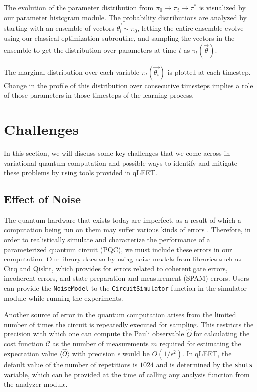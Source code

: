 The evolution of the parameter distribution from $\pi_0 \rightarrow \pi_t \rightarrow \pi^*$ is visualized by our parameter histogram module. The probability distributions are analyzed by starting with an ensemble of vectors $\vec{\theta_l} \sim \pi_0$, letting the entire ensemble evolve using our classical optimization subroutine, and sampling the vectors in the ensemble to get the distribution over parameters at time $t$ as $\pi_t(\vec{\theta})$. 

The marginal distribution over each variable $\pi_t(\vec{\theta_i})$ is plotted at each timestep. Change in the profile of this distribution over consecutive timesteps implies a role of those parameters in those timesteps of the learning process.


\section{\label{sec:challenges}Challenges}

In this section, we will discuss some key challenges that we come across in variational quantum computation and possible ways to identify and mitigate these problems by using tools provided in qLEET.

\subsection{Effect of Noise}

The quantum hardware that exists today are imperfect, as a result of which a computation being run on them may suffer various kinds of errors \cite{Chaudhary2022-kl}. Therefore, in order to realistically simulate and characterize the performance of a parameterized quantum circuit (PQC), we must include these errors in our computation. Our library does so by using noise models from libraries such as Cirq and Qiskit, which provides for errors related to coherent gate errors, incoherent errors, and state preparation and measurement (SPAM) errors. Users can provide the \texttt{NoiseModel} to the \texttt{CircuitSimulator} function in the simulator module while running the experiments. 

Another source of error in the quantum computation arises from the limited number of times the circuit is repeatedly executed for sampling. This restricts the precision with which one can compute the Pauli observable $\hat{O}$ for calculating the cost function $\mathcal{C}$ as the number of measurements $m$ required for estimating the expectation value $\langle\hat{O}\rangle$ with precision $\epsilon$ would be $O(1/\epsilon^2)$. In qLEET, the default value of the number of repetitions is $1024$ and is determined by the \texttt{shots} variable, which can be provided at the time of calling any analysis function from the analyzer module.


